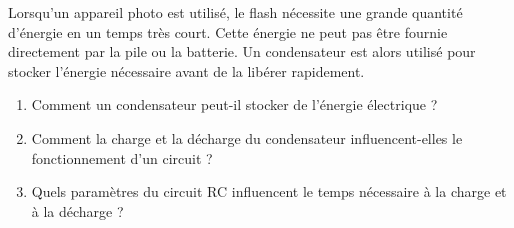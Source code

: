 \documentclass[12pt]{article}
\begin{document}
Lorsqu'un appareil photo est utilisé, le flash nécessite une grande quantité d'énergie en un temps très court. Cette énergie ne peut pas être fournie directement par la pile ou la batterie. Un condensateur est alors utilisé pour stocker l'énergie nécessaire avant de la libérer rapidement.

\begin{enumerate}
  \item Comment un condensateur peut-il stocker de l’énergie électrique ?
  \item Comment la charge et la décharge du condensateur influencent-elles le fonctionnement d’un circuit ?
  \item Quels paramètres du circuit RC influencent le temps nécessaire à la charge et à la décharge ?
\end{enumerate}
\end{document}
